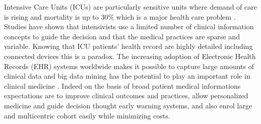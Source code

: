 %
%

Intensive Care Units (ICUs) are particularly sensitive units where demand of
care is rising\cite{angus2000} and mortality is up to 30\% which is a major
health care problem \cite{icu-mortality}. Studies have shown that intensivists
use a limited number of clinical information concepts to guide the
decision\cite{icu-evidence} and that the medical practices are sparse and
variable. Knowing that ICU patients' health record are highly detailed
including connected devices this is a paradox.
The increasing adoption of Electronic Health Records (EHR) systems worldwide
makes it possible to capture large amounts of clinical data
\cite{bigdata-promise} and big data mining has the potential to play an
important role in clinical medicine \cite{bigdata-mining}. Indeed on the basis
of broad patient medical informations expectations are to improve clinical
outcomes and practices, allow personalized medicine and guide decision thought
early warning systems, and also enrol large and multicentric cohort easily
while minimizing costs.
\\

